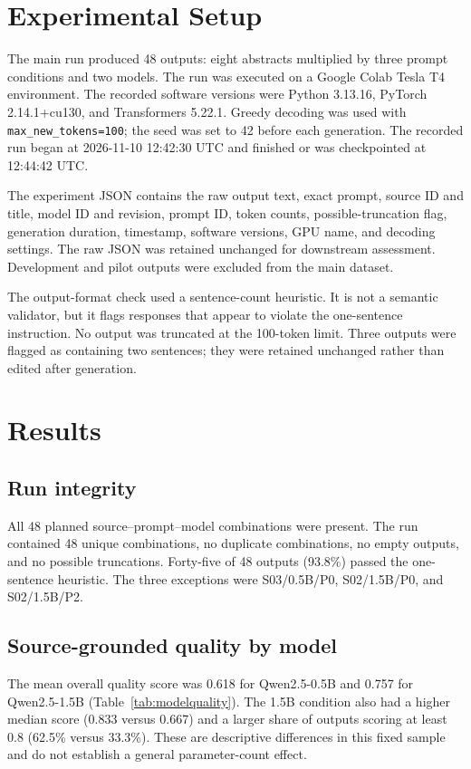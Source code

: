 \documentclass[acmsmall,screen,nonacm]{acmart}
\begin{document}
\section{Experimental Setup}
The main run produced 48 outputs: eight abstracts multiplied by three prompt conditions and two models. The run was executed on a Google Colab Tesla T4 environment. The recorded software versions were Python 3.13.16, PyTorch 2.14.1+cu130, and Transformers 5.22.1. Greedy decoding was used with \texttt{max\_new\_tokens=100}; the seed was set to 42 before each generation. The recorded run began at 2026-11-10 12:42:30 UTC and finished or was checkpointed at 12:44:42 UTC.

The experiment JSON contains the raw output text, exact prompt, source ID and title, model ID and revision, prompt ID, token counts, possible-truncation flag, generation duration, timestamp, software versions, GPU name, and decoding settings. The raw JSON was retained unchanged for downstream assessment. Development and pilot outputs were excluded from the main dataset.

The output-format check used a sentence-count heuristic. It is not a semantic validator, but it flags responses that appear to violate the one-sentence instruction. No output was truncated at the 100-token limit. Three outputs were flagged as containing two sentences; they were retained unchanged rather than edited after generation.

\section{Results}
\subsection{Run integrity}
All 48 planned source--prompt--model combinations were present. The run contained 48 unique combinations, no duplicate combinations, no empty outputs, and no possible truncations. Forty-five of 48 outputs (93.8\%) passed the one-sentence heuristic. The three exceptions were S03/0.5B/P0, S02/1.5B/P0, and S02/1.5B/P2.

\subsection{Source-grounded quality by model}
The mean overall quality score was 0.618 for Qwen2.5-0.5B and 0.757 for Qwen2.5-1.5B (Table~\ref{tab:modelquality}). The 1.5B condition also had a higher median score (0.833 versus 0.667) and a larger share of outputs scoring at least 0.8 (62.5\% versus 33.3\%). These are descriptive differences in this fixed sample and do not establish a general parameter-count effect.
\end{document}
